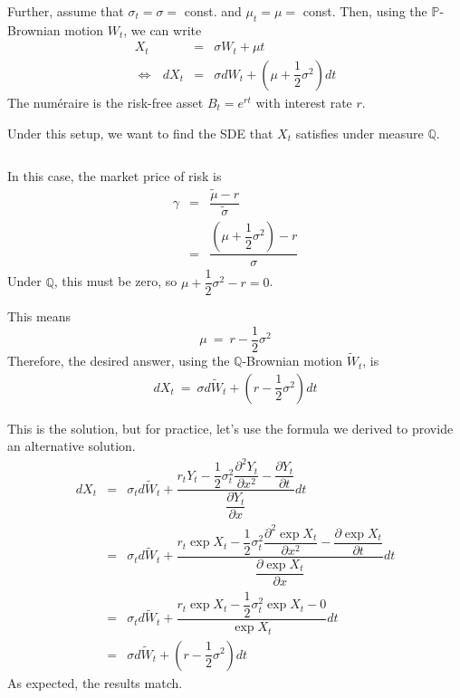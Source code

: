 \documentclass[uplatex,a4j,12pt,dvipdfmx]{jsarticle}
\begin{document}
Further, assume that $\sigma_{t} = \sigma = $ const. and $\mu_{t} = \mu = $ const.
Then, using the $\mathbb{P}$-Brownian motion $W_{t}$, we can write
%
%
\begin{eqnarray*}
	X_{t}
	&=&
	\sigma W_{t} + \mu t
	\\
	\Longleftrightarrow
	\ \ \
	dX_{t}
	&=&
	\sigma dW_{t} + \left( \mu + \dfrac{1}{2} \sigma^{2} \right) dt
\end{eqnarray*}
%
%
The numéraire is the risk-free asset $B_{t} = e^{rt}$ with interest rate $r$.

Under this setup, we want to find the SDE that $X_{t}$ satisfies under measure $\mathbb{Q}$.

${}$

In this case, the market price of risk is
%
%
\begin{eqnarray*}
	\gamma
	&=&
	\dfrac{ \tilde{\mu} - r }{ \tilde{\sigma} }
	\\ &=&
	\dfrac{ \left( \mu + \dfrac{1}{2} \sigma^{2} \right) - r }{ \sigma }
\end{eqnarray*}
%
%
Under $\mathbb{Q}$, this must be zero, so $\mu + \dfrac{1}{2} \sigma^{2} - r = 0$.

This means
$$
	\mu
	\ = \
	r - \dfrac{1}{2}\sigma^2
$$
Therefore, the desired answer, using the $\mathbb{Q}$-Brownian motion $\tilde{W}_{t}$, is
%
%
\begin{eqnarray*}
	dX_{t}
	\ = \
	\sigma d \tilde{W}_{t} + \left( r - \dfrac{1}{2} \sigma^2 \right) dt
\end{eqnarray*}
%
%

This is the solution, but for practice, let's use the formula we derived to provide an alternative solution.
%
%
\begin{eqnarray*}
	dX_{t}
	&=&
	\sigma_{t} d \tilde{W}_{t}
	+
	\dfrac{
		r_{t} Y_{t}
		-
		\dfrac{1}{2}
		\sigma_{t}^{2}
		\dfrac{ \partial^{2} Y_{t} }{ \partial x^{2} }
		-
		\dfrac{ \partial Y_{t} }{ \partial t }
	}
	{
		\dfrac{ \partial Y_{t} }{ \partial x }
	}
	dt
	\\[3mm] &=&
	\sigma_{t} d \tilde{W}_{t}
	+
	\dfrac{
		r_{t} \exp X_{t}
		-
		\dfrac{1}{2}
		\sigma_{t}^{2}
		\dfrac{ \partial^{2} \exp X_{t} }{ \partial x^{2} }
		-
		\dfrac{ \partial \exp X_{t} }{ \partial t }
	}
	{
		\dfrac{ \partial \exp X_{t} }{ \partial x }
	}
	dt
	\\[2mm] &=&
	\sigma_{t} d \tilde{W}_{t}
	+
	\dfrac{
		r_{t} \exp X_{t}
		-
		\dfrac{1}{2}
		\sigma_{t}^{2}
		\exp X_{t}
		-
		0
	}
	{
		\exp X_{t}
	}
	dt
	\\ &=&
	\sigma d \tilde{W}_{t} + \left( r - \dfrac{1}{2} \sigma^{2} \right) dt
\end{eqnarray*}
%
%
As expected, the results match.
\end{document}
